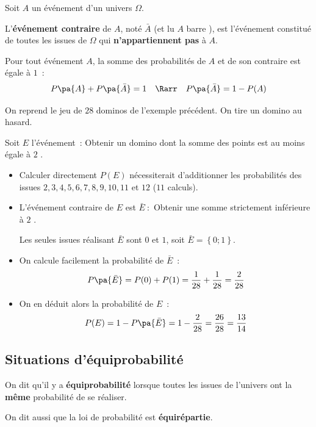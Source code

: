 \begin{defin}
	Soit $A$ un événement d'un univers $\Omega$.

	L'\textbf{événement contraire} de $A$, noté $\bar{A}$ (et lu \og $A$ barre \fg{}), est l'événement constitué de toutes les issues de $\Omega$ qui \textbf{n'appartiennent pas} à $A$.
\end{defin}

\begin{prop}
	Pour tout événement $A$, la somme des probabilités de $A$ et de son contraire est égale à $1$~:
	\[ P\pa{A} + P\pa{\bar{A}} = 1 \quad\Rarr\quad P\pa{\bar{A}} = 1 - P(A) \]
\end{prop}

\begin{ex}
	On reprend le jeu de $28$ dominos de l'exemple précédent. On tire un domino au hasard.

	Soit $E$ l'événement~: \og Obtenir un domino dont la somme des points est au moins égale à $2$ \fg{}.

	\begin{itemize}
		\item Calculer directement $P(E)$ nécessiterait d'additionner les probabilités des issues $2, 3, 4, 5, 6, 7, 8, 9, 10, 11$ et $12$ ($11$ calculs).

		\item L'événement contraire de $E$ est $\bar{E}~:$ \og Obtenir une somme strictement inférieure à $2$ \fg{}.

		      Les seules issues réalisant $\bar{E}$ sont $0$ et $1$, soit $\bar{E} = \left\{ 0 ; 1 \right\}$.

		\item On calcule facilement la probabilité de $\bar{E}$~:
		      \[ P\pa{\bar{E}} = P(0) + P(1) = \dfrac{1}{28} + \dfrac{1}{28} = \dfrac{2}{28} \]

		\item On en déduit alors la probabilité de $E$~:
		      \[ P(E) = 1 - P\pa{\bar{E}} = 1 - \dfrac{2}{28} = \dfrac{26}{28} = \dfrac{13}{14} \]
	\end{itemize}
\end{ex}

\subsection{Situations d'équiprobabilité}

\begin{defin}[Équiprobabilité]
	On dit qu'il y a \textbf{équiprobabilité} lorsque toutes les issues de l'univers ont la \textbf{même} probabilité de se réaliser.

	On dit aussi que la loi de probabilité est \textbf{équirépartie}.
\end{defin}


